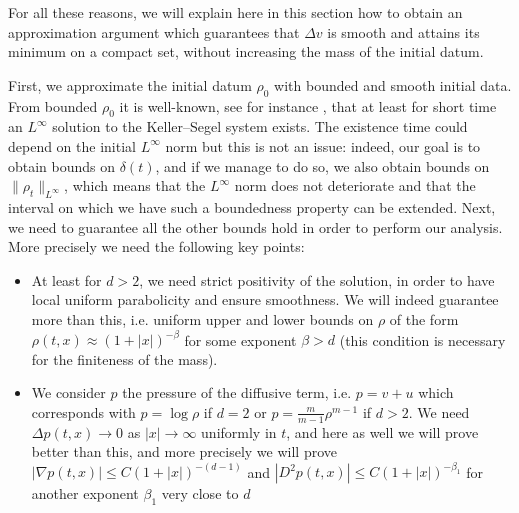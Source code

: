 \documentclass[11pt,a4paper]{article}
\numberwithin{equation}{section}
\theoremstyle{plain}
\theoremstyle{remark}
\begin{document}
For all these reasons, we will explain here in this section how to obtain an approximation argument which guarantees that $\Delta v$ is smooth and attains its minimum on a compact set, without increasing the mass of the initial datum.

First, we approximate the initial datum $\rho_0$ with bounded and smooth initial data. From bounded $\rho_0$ it is well-known, see for instance \cite{Carrillo_Santambrogio18}, that at least for short time an $L^\infty$ solution to the Keller--Segel system exists. The existence time could depend on the initial $L^\infty$ norm but this is not an issue: indeed, our goal is to obtain bounds on $\delta(t)$, and if we manage to do so, we also obtain bounds on $\|\rho_t\|_{L^\infty}$, which means that the $L^\infty$ norm does not deteriorate and that the interval on which we have such a boundedness property can be extended.
Next, we need to guarantee all the other bounds hold in order to perform our analysis. More precisely we need the following key points:
\begin{itemize}
\item At least for $d>2$, we need strict positivity of the solution, in order to have local uniform parabolicity and ensure smoothness. We will indeed guarantee more than this, i.e. uniform upper and lower bounds on $\rho$ of the form $\rho(t,x)\approx (1+|x|)^{-\beta}$ for some exponent $\beta>d$ (this condition is necessary for the finiteness of the mass).
\item We consider $p$ the pressure of the diffusive term, i.e. $p = v + u$ which corresponds with $p = \log \rho$ if $d = 2$ or $p = \frac{m}{m-1} \rho^{m-1}$ if $d > 2$. We need $\Delta p(t,x)\to 0$ as $|x|\to\infty$ uniformly in $t$, and here as well we will prove better than this, and more precisely we will prove $|\nabla p(t,x)|\leq C(1+|x|)^{-(d-1)}$ and $|D^2 p(t,x)|\leq C(1+|x|)^{-\beta_1}$ for another exponent $\beta_1$ very close to $d$ 
\end{itemize}
\end{document}
